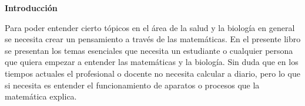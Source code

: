 
\begin{center}\textbf{Introducción}\end{center}

%
%
%

Para poder entender cierto tópicos en el área de la salud y la biología en general se necesita crear un pensamiento a través de las matemáticas. En el presente libro se presentan los temas esenciales que necesita un estudiante o cualquier persona que quiera empezar a entender las matemáticas y la biología. Sin duda que en los tiempos actuales el profesional o docente no necesita calcular a diario, pero lo que si necesita es entender el funcionamiento de aparatos o procesos que la matemática explica.\\

